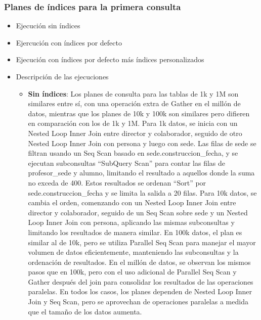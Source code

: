 \subsubsection{Planes de índices para la primera consulta}
\begin{itemize}
      \item{Ejecución sin índices}
      \item{Ejercución con índices por defecto}
      \item{Ejecución con índices por defecto más índices personalizados}
      \item{Descripción de las ejecuciones}
      \begin{itemize}
            \item {\textbf{Sin índices}: Los planes de consulta para las tablas de 1k y 1M son similares entre sí, con una operación extra de Gather en el millón de datos, mientras que los planes de 10k y 100k son similares pero difieren en comparación con los de 1k y 1M. Para 1k datos, se inicia con un Nested Loop Inner Join entre director y colaborador, seguido de otro Nested Loop Inner Join con persona y luego con sede. Las filas de sede se filtran usando un Seq Scan basado en sede.construccion\_fecha, y se ejecutan subconsultas ``SubQuery Scan'' para contar las filas de profesor\_sede y alumno, limitando el resultado a aquellos donde la suma no exceda de 400. Estos resultados se ordenan ``Sort'' por sede.construccion\_fecha y se limita la salida a 20 filas. Para 10k datos, se cambia el orden, comenzando con un Nested Loop Inner Join entre director y colaborador, seguido de un Seq Scan sobre sede y un Nested Loop Inner Join con persona, aplicando las mismas subconsultas y limitando los resultados de manera similar. En 100k datos, el plan es similar al de 10k, pero se utiliza Parallel Seq Scan para manejar el mayor volumen de datos eficientemente, manteniendo las subconsultas y la ordenación de resultados. En el millón de datos, se observan los mismos pasos que en 100k, pero con el uso adicional de Parallel Seq Scan y Gather después del join para consolidar los resultados de las operaciones paralelas. En todos los casos, los planes dependen de Nested Loop Inner Join y Seq Scan, pero se aprovechan de operaciones paralelas a medida que el tamaño de los datos aumenta.}

\end{itemize}
\end{itemize}
